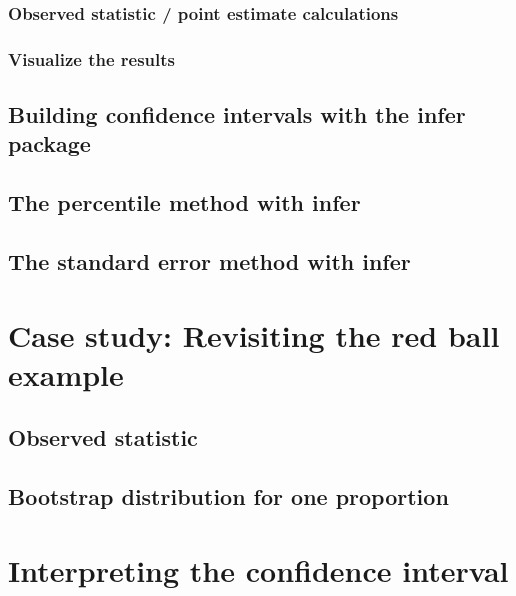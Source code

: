 \documentclass[12pt, krantz2,]{krantz}
\begin{document}
\hypertarget{observed-statistic-point-estimate-calculations}{%
\subsubsection*{Observed statistic / point estimate calculations}\label{observed-statistic-point-estimate-calculations}}


\hypertarget{visualize-the-results}{%
\subsubsection*{Visualize the results}\label{visualize-the-results}}


\hypertarget{infer-ci}{%
\subsection{Building confidence intervals with the infer package}\label{infer-ci}}

\hypertarget{percentile-method-infer}{%
\subsection{The percentile method with infer}\label{percentile-method-infer}}

\hypertarget{the-standard-error-method-with-infer}{%
\subsection{The standard error method with infer}\label{the-standard-error-method-with-infer}}

\hypertarget{one-prop-ci}{%
\section{Case study: Revisiting the red ball example}\label{one-prop-ci}}

\hypertarget{observed-statistic}{%
\subsection{Observed statistic}\label{observed-statistic}}

\hypertarget{one-prop-boot}{%
\subsection{Bootstrap distribution for one proportion}\label{one-prop-boot}}

\hypertarget{interpreting-the-confidence-interval}{%
\section{Interpreting the confidence interval}\label{interpreting-the-confidence-interval}}
\end{document}
